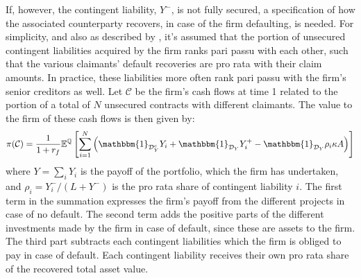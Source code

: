 \documentclass[../main.tex]{subfiles}
\begin{document}
        If, however, the contingent liability, $Y^{-}$, is not fully secured, a specification of how the associated counterparty recovers, in case of the firm defaulting, is needed.
        For simplicity, and also as described by \cite{ADS2019}, it's assumed that the portion of unsecured contingent liabilities acquired by the firm ranks pari passu with each other, such that the various claimants' default recoveries are pro rata with their claim amounts.
        In practice, these liabilities more often rank pari passu with the firm's senior creditors as well.
        Let $\mathcal{C}$ be the firm's cash flows at time 1 related to the portion of a total of $N$ unsecured contracts with different claimants. The value to the firm of these cash flows is then given by:
        \begin{equation} %
            \pi(\mathcal{C}) = \discountfactor \mathbb{E}^{\mathbb{Q}}\left[
            \sum_{i=1}^{N} \left(
                \mathbbm{1}_{\mathcal{D}_{Y}^{c}}Y_{i}
                + \mathbbm{1}_{\mathcal{D}_{Y}} Y_{i}^{+}
                - \mathbbm{1}_{\mathcal{D}_{Y}} \rho_{i} \kappa A
            \right)\right]
        \end{equation}
        where $Y = \sum_{i} Y_{i}$ is the payoff of the portfolio, which the firm has undertaken, and $\rho_{i} = Y_{i}^{-}/(L + Y^{-})$ is the pro rata share of contingent liability $i$. The first term in the summation expresses the firm's payoff from the different projects in case of no default. The second term adds the positive parts of the different investments made by the firm in case of default, since these are assets to the firm. The third part subtracts each contingent liabilities which the firm is obliged to pay in case of default. Each contingent liability receives their own pro rata share of the recovered total asset value.
\end{document}
